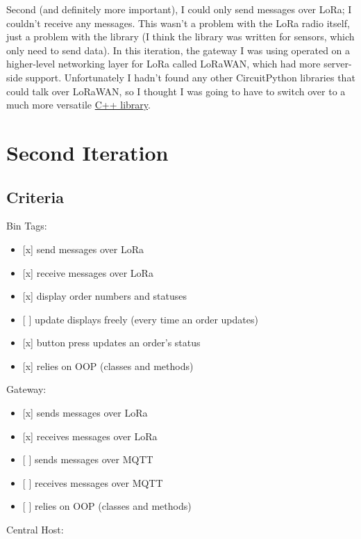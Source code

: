 \documentclass{article}
\begin{document}
Second (and definitely more important), I could only send messages over
LoRa; I couldn't receive any messages. This wasn't a problem with the
LoRa radio itself, just a problem with the library (I think the library
was written for sensors, which only need to send data). In this
iteration, the gateway I was using operated on a higher-level networking
layer for LoRa called LoRaWAN, which had more server-side support.
Unfortunately I hadn't found any other CircuitPython libraries that
could talk over LoRaWAN, so I thought I was going to have to switch over
to a much more versatile
\href{https://github.com/mcci-catena/arduino-lorawan}{C++ library}.

\section{Second Iteration}\label{second-iteration}

\subsection{Criteria}\label{criteria-2}

Bin Tags:

\begin{itemize}
\item
  {[}x{]} send messages over LoRa
\item
  {[}x{]} receive messages over LoRa
\item
  {[}x{]} display order numbers and statuses
\item
  {[} {]} update displays freely (every time an order updates)
\item
  {[}x{]} button press updates an order's status
\item
  {[}x{]} relies on OOP (classes and methods)
\end{itemize}

Gateway:

\begin{itemize}
\item
  {[}x{]} sends messages over LoRa
\item
  {[}x{]} receives messages over LoRa
\item
  {[} {]} sends messages over MQTT
\item
  {[} {]} receives messages over MQTT
\item
  {[} {]} relies on OOP (classes and methods)
\end{itemize}

Central Host:
\end{document}
